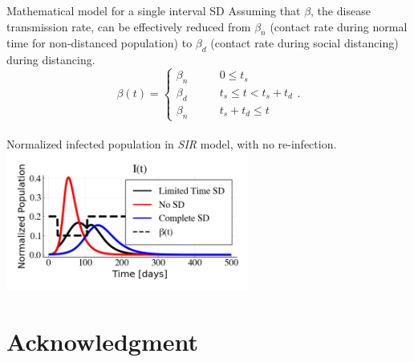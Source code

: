 \documentclass[10pt]{beamer}
\begin{document}
\begin{frame}{Mathematical model for a single interval SD}
	Assuming that $\beta$, the disease transmission rate, can be effectively reduced from $\beta_{n}$ (contact rate during normal time for non-distanced population) to $\beta_{d}$ (contact rate during social distancing) during distancing. \\ \vspace{0.5cm}
	\begin{equation} \label{eq:beta}
		\beta(t) = \left\{
		\begin{matrix} 
			\beta_n & \qquad 0 \leq t_s \\ 
			\beta_d & \qquad t_s \leq t < t_s+t_d \\
			\beta_n  & \qquad t_s+t_d \leq t 
		\end{matrix}
		\right. .
	\end{equation} \\ \vspace{0.5cm}
	Normalized infected population in \textit{SIR} model, with no re-infection. \\
	\hspace{2cm} \includegraphics[width=0.6\textwidth]{epidemic-sd.png}\\
\end{frame}


\section{Acknowledgment}
\end{document}
